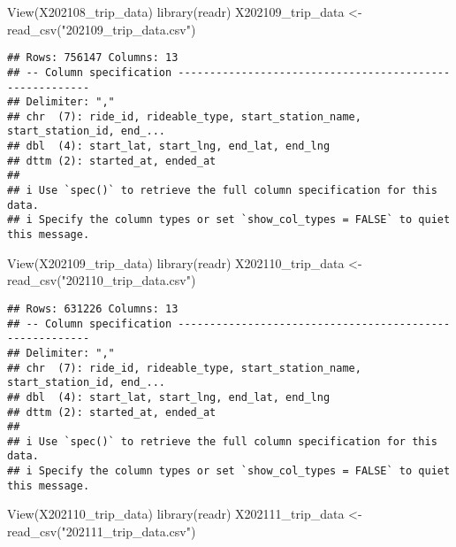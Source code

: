 \documentclass[
]{article}
\newenvironment{Shaded}{\begin{snugshade}}{\end{snugshade}}
\newcommand{\FunctionTok}[1]{\textcolor[rgb]{0.00,0.00,0.00}{#1}}
\newcommand{\NormalTok}[1]{#1}
\newcommand{\OtherTok}[1]{\textcolor[rgb]{0.56,0.35,0.01}{#1}}
\newcommand{\StringTok}[1]{\textcolor[rgb]{0.31,0.60,0.02}{#1}}
\begin{document}
\begin{Shaded}
\begin{Highlighting}[]
\FunctionTok{View}\NormalTok{(X202108\_trip\_data)}
\FunctionTok{library}\NormalTok{(readr)}
\NormalTok{X202109\_trip\_data }\OtherTok{\textless{}{-}} \FunctionTok{read\_csv}\NormalTok{(}\StringTok{"202109\_trip\_data.csv"}\NormalTok{)}
\end{Highlighting}
\end{Shaded}

\begin{verbatim}
## Rows: 756147 Columns: 13
## -- Column specification --------------------------------------------------------
## Delimiter: ","
## chr  (7): ride_id, rideable_type, start_station_name, start_station_id, end_...
## dbl  (4): start_lat, start_lng, end_lat, end_lng
## dttm (2): started_at, ended_at
## 
## i Use `spec()` to retrieve the full column specification for this data.
## i Specify the column types or set `show_col_types = FALSE` to quiet this message.
\end{verbatim}

\begin{Shaded}
\begin{Highlighting}[]
\FunctionTok{View}\NormalTok{(X202109\_trip\_data)}
\FunctionTok{library}\NormalTok{(readr)}
\NormalTok{X202110\_trip\_data }\OtherTok{\textless{}{-}} \FunctionTok{read\_csv}\NormalTok{(}\StringTok{"202110\_trip\_data.csv"}\NormalTok{)}
\end{Highlighting}
\end{Shaded}

\begin{verbatim}
## Rows: 631226 Columns: 13
## -- Column specification --------------------------------------------------------
## Delimiter: ","
## chr  (7): ride_id, rideable_type, start_station_name, start_station_id, end_...
## dbl  (4): start_lat, start_lng, end_lat, end_lng
## dttm (2): started_at, ended_at
## 
## i Use `spec()` to retrieve the full column specification for this data.
## i Specify the column types or set `show_col_types = FALSE` to quiet this message.
\end{verbatim}

\begin{Shaded}
\begin{Highlighting}[]
\FunctionTok{View}\NormalTok{(X202110\_trip\_data)}
\FunctionTok{library}\NormalTok{(readr)}
\NormalTok{X202111\_trip\_data }\OtherTok{\textless{}{-}} \FunctionTok{read\_csv}\NormalTok{(}\StringTok{"202111\_trip\_data.csv"}\NormalTok{)}
\end{Highlighting}
\end{Shaded}
\end{document}
